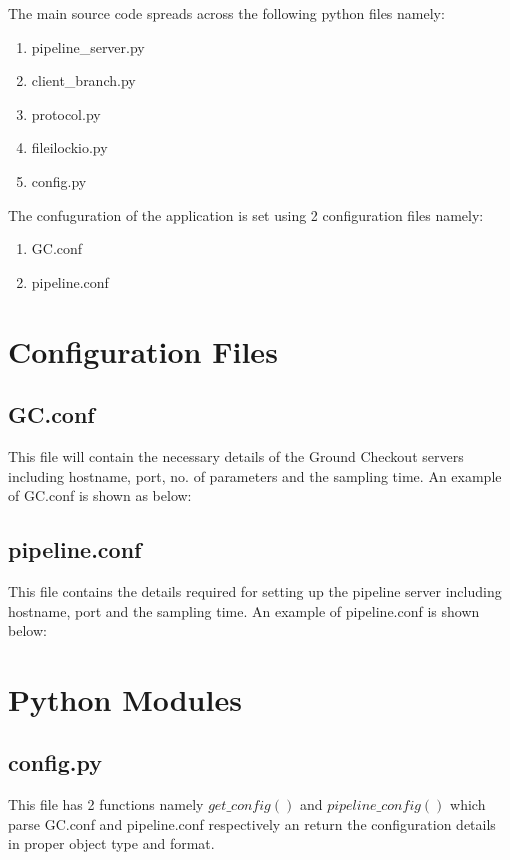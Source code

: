 The main source code spreads across the following python files namely:
\begin{enumerate}
	\item pipeline\_server.py
	\item client\_branch.py
	\item protocol.py
	\item fileilockio.py
	\item config.py
\end{enumerate}
The confuguration of the application is set using 2 configuration files namely:
\begin{enumerate}
	\item GC.conf
	\item pipeline.conf
\end{enumerate}

\section{Configuration Files}

\subsection{GC.conf}
This file will contain the necessary details of the Ground Checkout servers
including hostname, port, no. of parameters and the sampling time. An example
of GC.conf is shown as below:


\subsection{pipeline.conf}
This file contains the details required for setting up the pipeline server
including hostname, port and the sampling time. An example of pipeline.conf is
shown below:



\section{Python Modules}

\subsection{config.py}
This file has 2 functions namely $get\_config()$ and $pipeline\_config()$ which
parse GC.conf and pipeline.conf respectively an return the configuration
details in proper object type and format.


